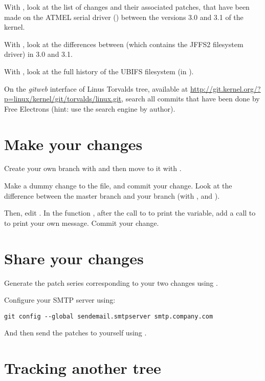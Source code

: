 With , look at the list of changes and their associated
patches, that have been made on the ATMEL serial driver
() between the versions 3.0
and 3.1 of the kernel.

With , look at the differences between 
(which contains the JFFS2 filesystem driver) in 3.0 and 3.1.

With , look at the full history of the UBIFS filesystem (in
).

On the {\em gitweb} interface of Linus Torvalds tree, available at
\url{http://git.kernel.org/?p=linux/kernel/git/torvalds/linux.git},
search all commits that have been done by Free Electrons (hint: use
the search engine by author).

\section{Make your changes}

Create your own branch with  and then move to it with
.

Make a dummy change to the  file, and commit your
change. Look at the difference between the master branch and your
branch (with ,  and ).

Then, edit . In the function ,
after the call to  to print the 
variable, add a call to  to print your own
message. Commit your change.

\section{Share your changes}

Generate the patch series corresponding to your two changes using
.

Configure your SMTP server using:

\begin{verbatim}
git config --global sendemail.smtpserver smtp.company.com
\end{verbatim}

And then send the patches to yourself using .

\section{Tracking another tree}

